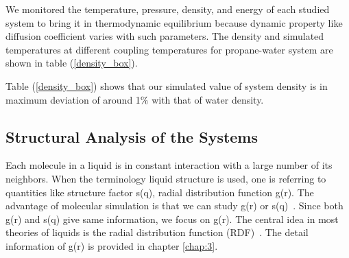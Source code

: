  
 
We monitored the temperature, pressure, density, and energy of each studied system to bring it in  thermodynamic equilibrium because dynamic property like diffusion coefficient varies with
such parameters.  The density and simulated temperatures at different coupling temperatures for propane-water system are shown in table (\ref{density_box}).
\begin{table}[H]
\centering
\caption[Values of simulated temperature  and density at various coupling temperatures of propane-water system.]{Values of simulated temperature ($T_{sim}$) and density at various coupling temperatures ($T_{co}$) of propane-water system.}
\label{density_box}
\end{table}
 Table (\ref{density_box}) shows that our simulated value of system density is in maximum deviation of around 1$\%$ with that of water density. 
  
  \subsection{Structural Analysis  of the  Systems}
  Each molecule in a liquid is in constant interaction with a large number of its  neighbors. When the terminology liquid structure is used, one is referring to
  quantities like structure factor s(q), radial distribution function g(r). The advantage of molecular simulation is that we can study g(r) or s(q)~\citep{adhikari2004}. Since both g(r) and s(q) give same information, we focus on g(r). The central idea in most theories of   liquids is the radial distribution function (RDF)~\citep{mcquarrie2000}. The detail information of   g(r) is provided in chapter \ref {chap:3}.

